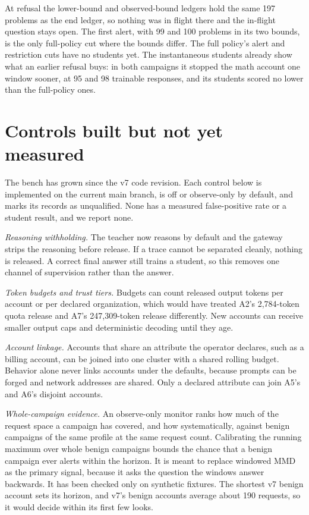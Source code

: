 \documentclass[journal]{IEEEtran}
\begin{document}
At refusal the lower-bound and observed-bound ledgers hold the same 197 problems as the end ledger, so nothing was in flight there and the in-flight question stays open. The first alert, with 99 and 100 problems in its two bounds, is the only full-policy cut where the bounds differ. The full policy's alert and restriction cuts have no students yet. The instantaneous students already show what an earlier refusal buys: in both campaigns it stopped the math account one window sooner, at 95 and 98 trainable responses, and its students scored no lower than the full-policy ones.

\section{Controls built but not yet measured}
\label{sec:current}
The bench has grown since the v7 code revision. Each control below is implemented on the current main branch, is off or observe-only by default, and marks its records as unqualified. None has a measured false-positive rate or a student result, and we report none.

\textit{Reasoning withholding.} The teacher now reasons by default and the gateway strips the reasoning before release. If a trace cannot be separated cleanly, nothing is released. A correct final answer still trains a student, so this removes one channel of supervision rather than the answer.

\textit{Token budgets and trust tiers.} Budgets can count released output tokens per account or per declared organization, which would have treated A2's 2,784-token quota release and A7's 247,309-token release differently. New accounts can receive smaller output caps and deterministic decoding until they age.

\textit{Account linkage.} Accounts that share an attribute the operator declares, such as a billing account, can be joined into one cluster with a shared rolling budget. Behavior alone never links accounts under the defaults, because prompts can be forged and network addresses are shared. Only a declared attribute can join A5's and A6's disjoint accounts.

\textit{Whole-campaign evidence.} An observe-only monitor ranks how much of the request space a campaign has covered, and how systematically, against benign campaigns of the same profile at the same request count. Calibrating the running maximum over whole benign campaigns bounds the chance that a benign campaign ever alerts within the horizon. It is meant to replace windowed MMD as the primary signal, because it asks the question the windows answer backwards. It has been checked only on synthetic fixtures. The shortest v7 benign account sets its horizon, and v7's benign accounts average about 190 requests, so it would decide within its first few looks.
\end{document}
